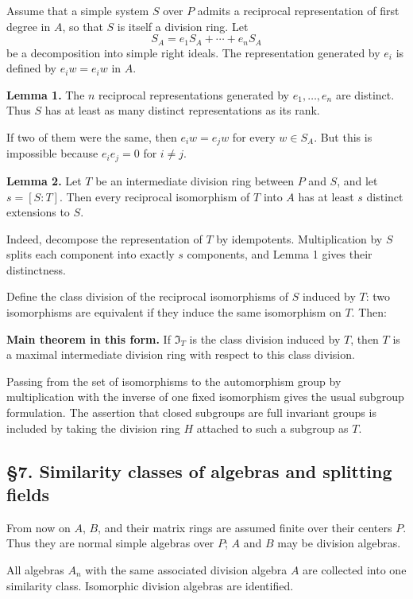 \documentclass[11pt]{article}
\begin{document}
Assume that a simple system \(S\) over \(P\) admits a reciprocal
representation of first degree in \(A\), so that \(S\) is itself a
division ring. Let \[
  S_A=e_1S_A+
\cdots+e_nS_A
\] be a decomposition into simple right ideals. The representation
generated by \(e_i\) is defined by \(e_iw=e_iw\) in \(A\).

\textbf{Lemma 1.} The \(n\) reciprocal representations generated by
\(e_1,
\ldots,e_n\) are distinct. Thus \(S\) has at least as many distinct
representations as its rank.

If two of them were the same, then \(e_iw=e_jw\) for every \(w\in S_A\).
But this is impossible because \(e_ie_j=0\) for \(i\ne j\).

\textbf{Lemma 2.} Let \(T\) be an intermediate division ring between
\(P\) and \(S\), and let \(s=[S:T]\). Then every reciprocal isomorphism
of \(T\) into \(A\) has at least \(s\) distinct extensions to \(S\).

Indeed, decompose the representation of \(T\) by idempotents.
Multiplication by \(S\) splits each component into exactly \(s\)
components, and Lemma 1 gives their distinctness.

Define the class division of the reciprocal isomorphisms of \(S\)
induced by \(T\): two isomorphisms are equivalent if they induce the
same isomorphism on \(T\). Then:

\textbf{Main theorem in this form.} If \(\mathfrak I_T\) is the class
division induced by \(T\), then \(T\) is a maximal intermediate division
ring with respect to this class division.

Passing from the set of isomorphisms to the automorphism group by
multiplication with the inverse of one fixed isomorphism gives the usual
subgroup formulation. The assertion that closed subgroups are full
invariant groups is included by taking the division ring \(H\) attached
to such a subgroup as \(T\).

\subsection{§7. Similarity classes of algebras and splitting
fields}\label{similarity-classes-of-algebras-and-splitting-fields}

From now on \(A\), \(B\), and their matrix rings are assumed finite over
their centers \(P\). Thus they are normal simple algebras over \(P\);
\(A\) and \(B\) may be division algebras.

All algebras \(A_n\) with the same associated division algebra \(A\) are
collected into one similarity class. Isomorphic division algebras are
identified.
\end{document}
